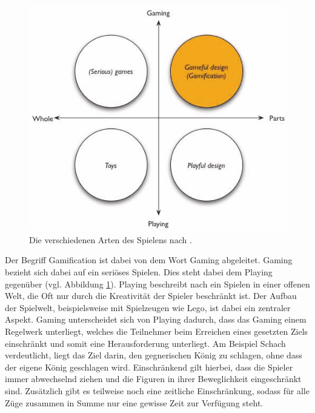 \documentclass[
	oneside,  %
	ngerman, 
	final, 
	11pt, 
	a4paper, 
	1.1headlines, 
	headinclude=false, 
	footinclude=false, 
	mpinclude=false, 
	pagesize, 
	onecolumn, 
	titlepage, 
	parskip=half, 
	headsepline, 
	chapterprefix=false, 
	version=first, 
	listof=totoc, 
	bibliography=totoc, 
	toc=graduated, 
	fleqn
]{scrbook}
\begin{document}
\begin{figure}[htb]
	\begin{center}
		\includegraphics[scale=0.6]{images/gamification_einordnung}
		\caption{Die verschiedenen Arten des Spielens nach \cite{DD2011}.}
		\label{gamification_einordnung}
	\end{center}
\end{figure}

Der Begriff Gamification ist dabei von dem Wort \glqq Gaming \grqq{} abgeleitet.
Gaming bezieht sich dabei auf ein seriöses Spielen.
Dies steht dabei dem \glqq Playing \grqq{} gegenüber (vgl. Abbildung \ref{gamification_einordnung}).
Playing beschreibt nach \cite{Wa2003} ein Spielen in einer offenen Welt, die Oft nur durch die Kreativität der Spieler beschränkt ist.
Der Aufbau der Spielwelt, beispielsweise mit Spielzeugen wie Lego, ist dabei ein zentraler Aspekt.
Gaming unterscheidet sich\cite{DD2011} von Playing dadurch, dass das Gaming einem Regelwerk unterliegt, welches die Teilnehmer beim Erreichen eines gesetzten Ziels einschränkt und somit eine Herausforderung unterliegt.
Am Beispiel Schach verdeutlicht, liegt das Ziel darin, den gegnerischen König zu schlagen, ohne dass der eigene König geschlagen wird.
Einschränkend gilt hierbei, dass die Spieler immer abwechselnd ziehen und die Figuren in ihrer Beweglichkeit eingeschränkt sind.
Zusätzlich gibt es teilweise noch eine zeitliche Einschränkung, sodass für alle Züge zusammen in Summe nur eine gewisse Zeit zur Verfügung steht.
\end{document}
